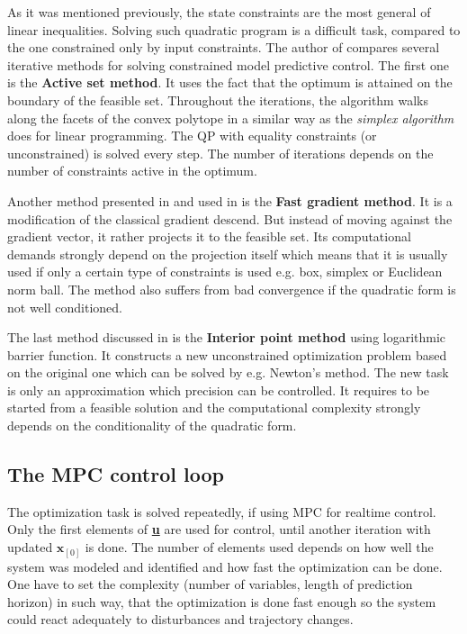 As it was mentioned previously, the state constraints are the most general of linear inequalities. Solving such quadratic program is a difficult task, compared to the one constrained only by input constraints. The author of \citep{mikulas2013} compares several iterative methods for solving constrained model predictive control. The first one is the \textbf{Active set method}. It uses the fact that the optimum is attained on the boundary of the feasible set. Throughout the iterations, the algorithm walks along the facets of the convex polytope in a similar way as the \textit{simplex algorithm} does for linear programming. The QP with equality constraints (or unconstrained) is solved every step. The number of iterations depends on the number of constraints active in the optimum.

Another method presented in \citep{mikulas2013} and used in \citep{zometa2012segway} is the \textbf{Fast gradient method}. It is a modification of the classical gradient descend. But instead of moving against the gradient vector, it rather projects it to the feasible set. Its computational demands strongly depend on the projection itself which means that it is usually used if only a certain type of constraints is used e.g. box, simplex or Euclidean norm ball. The method also suffers from bad convergence if the quadratic form is not well conditioned.

The last method discussed in \citep{mikulas2013} is the \textbf{Interior point method} using logarithmic barrier function. It constructs a new unconstrained optimization problem based on the original one which can be solved by e.g. Newton's method. The new task is only an approximation which precision can be controlled. It requires to be started from a feasible solution and the computational complexity strongly depends on the conditionality of the quadratic form.

\subsection{The MPC control loop}
\label{cap:qmpc_control_loop}

The optimization task is solved repeatedly, if using MPC for realtime control. Only the first elements of \textbf{\underline{u}} are used for control, until another iteration with updated $\textbf{x}_{[0]}$ is done. The number of elements used depends on how well the system was modeled and identified and how fast the optimization can be done. One have to set the complexity (number of variables, length of prediction horizon) in such way, that the optimization is done fast enough so the system could react adequately to disturbances and trajectory changes.

